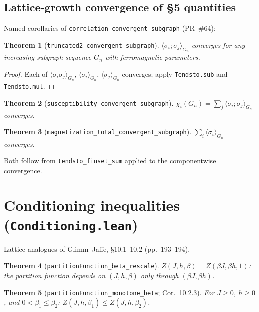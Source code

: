 \documentclass[a4paper,11pt]{article}
\newtheorem{theorem}{Theorem}
\begin{document}
\subsection{Lattice-growth convergence of \S5 quantities}

Named corollaries of \texttt{correlation\_convergent\_subgraph} (PR~\#64):

\begin{theorem}[\texttt{truncated2\_convergent\_subgraph}]
$\langle\sigma_i;\sigma_j\rangle_{G_n}$ converges for any increasing subgraph
sequence $G_n$ with ferromagnetic parameters.
\end{theorem}

\begin{proof}
Each of $\langle\sigma_i\sigma_j\rangle_{G_n}$, $\langle\sigma_i\rangle_{G_n}$,
$\langle\sigma_j\rangle_{G_n}$ converges; apply \texttt{Tendsto.sub} and
\texttt{Tendsto.mul}.
\end{proof}

\begin{theorem}[\texttt{susceptibility\_convergent\_subgraph}]
$\chi_i(G_n) = \sum_j \langle\sigma_i;\sigma_j\rangle_{G_n}$ converges.
\end{theorem}

\begin{theorem}[\texttt{magnetization\_total\_convergent\_subgraph}]
$\sum_i \langle\sigma_i\rangle_{G_n}$ converges.
\end{theorem}

Both follow from \texttt{tendsto\_finset\_sum} applied to the componentwise
convergence.

\section{Conditioning inequalities (\texttt{Conditioning.lean})}

Lattice analogues of Glimm--Jaffe, \S10.1--10.2 (pp.~193--194).

\begin{theorem}[\texttt{partitionFunction\_beta\_rescale}]
$Z(J, h, \beta) = Z(\beta J, \beta h, 1)$: the partition function
depends on $(J, h, \beta)$ only through $(\beta J, \beta h)$.
\end{theorem}

\begin{theorem}[\texttt{partitionFunction\_monotone\_beta}; Cor.~10.2.3]
For $J \ge 0$, $h \ge 0$, and $0 < \beta_1 \le \beta_2$:
$Z(J, h, \beta_1) \le Z(J, h, \beta_2)$.
\end{theorem}
\end{document}
